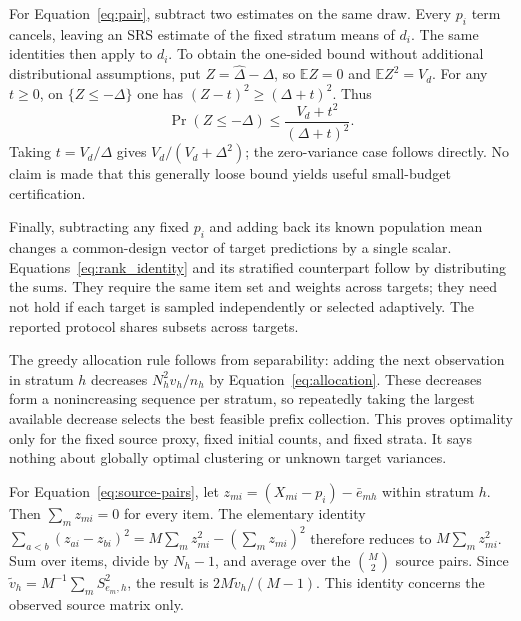 \documentclass{article}
\newcommand{\E}{\mathbb{E}}
\begin{document}
For Equation~\eqref{eq:pair}, subtract two estimates on the same draw. Every $p_i$ term cancels, leaving an SRS estimate of the fixed stratum means of $d_i$. The same identities then apply to $d_i$. To obtain the one-sided bound without additional distributional assumptions, put $Z=\widehat\Delta-\Delta$, so $\E Z=0$ and $\E Z^2=V_d$. For any $t\geq0$, on $\{Z\leq-\Delta\}$ one has $(Z-t)^2\geq(\Delta+t)^2$. Thus
\begin{equation}
\Pr(Z\leq-\Delta)\leq\frac{V_d+t^2}{(\Delta+t)^2}.
\end{equation}
Taking $t=V_d/\Delta$ gives $V_d/(V_d+\Delta^2)$; the zero-variance case follows directly. No claim is made that this generally loose bound yields useful small-budget certification.

Finally, subtracting any fixed $p_i$ and adding back its known population mean changes a common-design vector of target predictions by a single scalar. Equations~\eqref{eq:rank_identity} and its stratified counterpart follow by distributing the sums. They require the same item set and weights across targets; they need not hold if each target is sampled independently or selected adaptively. The reported protocol shares subsets across targets.

The greedy allocation rule follows from separability: adding the next observation in stratum $h$ decreases $N_h^2v_h/n_h$ by Equation~\eqref{eq:allocation}. These decreases form a nonincreasing sequence per stratum, so repeatedly taking the largest available decrease selects the best feasible prefix collection. This proves optimality only for the fixed source proxy, fixed initial counts, and fixed strata. It says nothing about globally optimal clustering or unknown target variances.

For Equation~\eqref{eq:source-pairs}, let $z_{mi}=(X_{mi}-p_i)-\bar e_{mh}$ within stratum $h$. Then $\sum_m z_{mi}=0$ for every item. The elementary identity $\sum_{a<b}(z_{ai}-z_{bi})^2=M\sum_m z_{mi}^2-(\sum_m z_{mi})^2$ therefore reduces to $M\sum_m z_{mi}^2$. Sum over items, divide by $N_h-1$, and average over the $\binom M2$ source pairs. Since $\widetilde v_h=M^{-1}\sum_m S^2_{e_m,h}$, the result is $2M\widetilde v_h/(M-1)$. This identity concerns the observed source matrix only.
\end{document}

